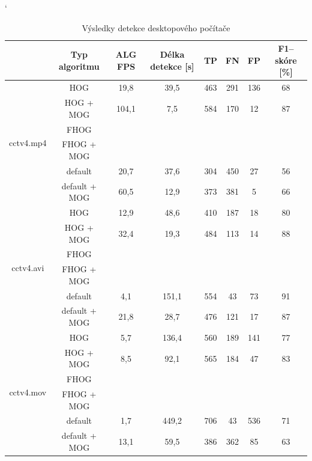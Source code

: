 \begin{table}[H]
\catcode`
\centering
\caption{Výsledky detekce desktopového počítače}
\label{resultTabDesktop}
\begin{tabular}{|c|c|c|c|c|c|c|c|}
\hline
                         & Typ algoritmu   	& ALG FPS & Délka detekce [s] & TP 	& FN   & FP & F1--skóre [\%]\\ \hline
\multirow{6}{*}{cctv4.mp4} & HOG        	&  19,8   & 39,5       		  & 463 & 291    & 136   &  68        \\ \cline{2-8} 
                         & HOG + MOG  		& 104,1   &  7,5       		  & 584 & 170    & 12    & 87          \\ \cline{2-8} 
                         & FHOG       		&         &            		  &     &    &    &          \\ \cline{2-8} 
                         & FHOG + MOG 		&         &            		  &     &    &    &          \\ \cline{2-8}  
                         & default	 		&  20,7   & 37,6                & 304 & 450    & 27    & 56          \\ \cline{2-8} 
                         & default + MOG 	&  60,5   & 12,9                & 373 & 381    & 5     & 66          \\ \hline\hline 
\multirow{6}{*}{cctv4.avi} & HOG        	&  12,9   & 48,6           	  &  410& 187    & 18    & 80          \\ \cline{2-8} 
                         & HOG + MOG  		&  32,4   & 19,3          	  & 484 & 113    & 14    & 88          \\ \cline{2-8} 
                         & FHOG       		&         &               	  &    	&    &    &          \\ \cline{2-8} 
                         & FHOG + MOG 		&         &               	  &    	&    &    &          \\ \cline{2-8} 
                         & default  		& 4,1     & 151,1               & 554 & 43     & 73    & 91          \\ \cline{2-8} 
                         & default + MOG 	& 21,8    & 28,7                & 476 & 121    & 17    & 87          \\ \hline \hline
\multirow{6}{*}{cctv4.mov} & HOG        	& 5,7     & 136,4               & 560 & 189    & 141   & 77          \\ \cline{2-8} 
                         & HOG + MOG  		& 8,5     &  92,1               & 565 & 184    & 47    & 83          \\ \cline{2-8} 
                         & FHOG       		&         &               	  &    	&    &    &          \\ \cline{2-8} 
                         & FHOG + MOG 		&         &                     &    	&    &    &          \\ \cline{2-8} 
                         & default  		& 1,7     & 449,2               & 706   & 43    & 536    & 71          \\ \cline{2-8} 
                         & default + MOG 	& 13,1    &  59,5               & 386   & 362    & 85    & 63          \\ \hline
\end{tabular}
\end{table}
